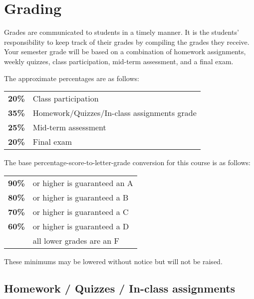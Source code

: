 \documentclass[12pt]{scrartcl}
\begin{document}




\section{Grading}

Grades are communicated to students in a timely manner. 
It is the students’ responsibility to keep track of their grades by compiling the grades they receive. 
Your semester grade will be based on a combination of homework assignments, weekly quizzes, class participation,  mid-term assessment, and a final exam. 

The approximate percentages are as follows:
\begin{center}
\begin{tabular}{rl}
\textbf{20\% } & Class participation \\
\textbf{35\% } & Homework/Quizzes/In-class assignments grade\\
\textbf{25\% } & Mid-term assessment\\
\textbf{20\% } & Final exam\\
\end{tabular}
\end{center}
The base percentage-score-to-letter-grade conversion for this course is as follows: 

\begin{center}
\begin{tabular}{rl}
\textbf{90\%}& or higher is guaranteed an A \\
\textbf{80\%}& or higher is guaranteed a B \\
\textbf{70\%}& or higher is guaranteed a C \\
\textbf{60\%}& or higher is guaranteed a D \\
\textbf{}& all lower grades are an F 
\end{tabular}
\end{center}
These minimums may be lowered without notice but will not be raised. 

\subsection{Homework / Quizzes / In-class assignments}
\end{document}

